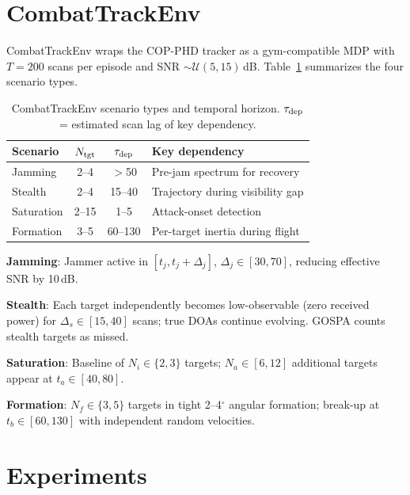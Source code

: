 \documentclass[conference]{IEEEtran}
\begin{document}
\section{CombatTrackEnv}
\label{sec:env}

CombatTrackEnv wraps the COP-PHD tracker as a gym-compatible MDP with
$T{=}200$ scans per episode and SNR ${\sim}\mathcal{U}(5,15)$\,dB.
Table~\ref{tab:scenarios} summarizes the four scenario types.

\begin{table}[t]
  \centering
  \caption{CombatTrackEnv scenario types and temporal horizon.
           $\tau_{\rm dep}$ = estimated scan lag of key dependency.}
  \label{tab:scenarios}
  \setlength{\tabcolsep}{4pt}
  \begin{tabular}{lccp{3.2cm}}
    \toprule
    Scenario & $N_{\rm tgt}$ & $\tau_{\rm dep}$ & Key dependency \\
    \midrule
    Jamming    & 2--4 & $>$50 & Pre-jam spectrum for recovery \\
    Stealth    & 2--4 & 15--40 & Trajectory during visibility gap \\
    Saturation & 2--15 & 1--5  & Attack-onset detection \\
    Formation  & 3--5 & 60--130 & Per-target inertia during flight \\
    \bottomrule
  \end{tabular}
\end{table}

\textbf{Jamming}: Jammer active in $[t_j, t_j{+}\Delta_j]$,
$\Delta_j \in [30,70]$, reducing effective SNR by 10\,dB.

\textbf{Stealth}: Each target independently becomes low-observable
(zero received power) for $\Delta_s \in [15,40]$ scans;
true DOAs continue evolving.
GOSPA counts stealth targets as missed.

\textbf{Saturation}: Baseline of $N_i \in \{2,3\}$ targets;
$N_a \in [6,12]$ additional targets appear at $t_a \in [40,80]$.

\textbf{Formation}: $N_f \in \{3,5\}$ targets in tight 2--4$^\circ$
angular formation; break-up at $t_b \in [60,130]$ with independent
random velocities.


\section{Experiments}
\label{sec:experiments}
\end{document}
